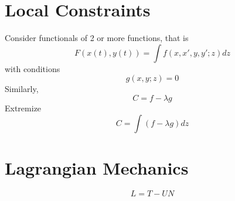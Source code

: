 \documentclass{article}
\newtheorem{one minute paper}[theorem]{One Minute Paper}
\begin{document}
\section*{Local Constraints}
Consider functionals of 2 or more functions, that is 
\begin{equation}
    F(x(t),y(t))  = \int f(x,x',y,y';z)dz
\end{equation}
with conditions 
\begin{equation}
    g(x,y;z) = 0
\end{equation}
Similarly, 
\begin{equation}
    C = f - \lambda g
\end{equation}
Extremize 
\begin{equation}
    C = \int (f-\lambda g)dz
\end{equation}

\section*{Lagrangian Mechanics}

\begin{equation}
    L = T - UN
\end{equation}
\end{document}
